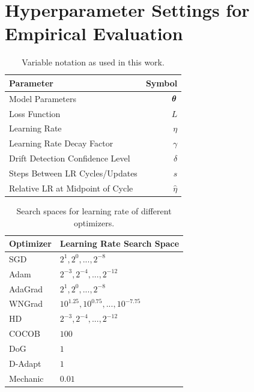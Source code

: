 \documentclass{article} %
\begin{document}



\newpage
\appendix
\section{Hyperparameter Settings for Empirical Evaluation}\label{app:hyperparams}

\begin{table}[h]
   \centering
   \caption{Variable notation as used in this work.}
   \begin{tabular}{lr}
      \toprule
      Parameter                        & Symbol       \\
      \midrule
      Model Parameters                 & ${\bm{\theta}} $   \\
      Loss Function                    & $L$          \\
      Learning Rate                    & $\eta$       \\
      Learning Rate Decay Factor       & $\gamma$     \\
      Drift Detection Confidence Level & $\delta$     \\
      Steps Between LR Cycles/Updates  & $s$          \\
      Relative LR at Midpoint of Cycle & $\hat{\eta}$ \\
      \bottomrule
   \end{tabular}
\end{table}

\begin{table}[h]
   \centering
   \caption{Search spaces for learning rate of different optimizers.}
   \begin{tabular}{l l}
      \toprule
      Optimizer & Learning Rate Search Space                \\
      \midrule
      SGD       & ${2^1, 2^0, ..., 2^{-8}}$                 \\
      Adam      & ${2^{-3}, 2^{-4}, ..., 2^{-12}}$          \\
      AdaGrad   & ${2^1, 2^0, ..., 2^{-8}}$                 \\
      WNGrad    & ${10^{1.25}, 10^{0.75}, ..., 10^{-7.75}}$ \\
      HD        & ${2^{-3}, 2^{-4}, ..., 2^{-12}}$          \\
      COCOB     & $100$                                     \\
      DoG       & $1$                                       \\
      D-Adapt   & $1$                                       \\
      Mechanic  & $0.01$                                    \\
      \bottomrule
   \end{tabular}
\end{table}
\end{document}
